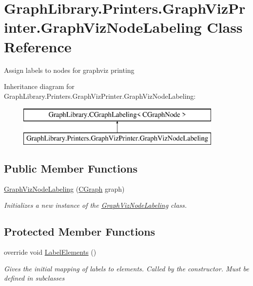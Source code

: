 \hypertarget{class_graph_library_1_1_printers_1_1_graph_viz_printer_1_1_graph_viz_node_labeling}{}\section{Graph\+Library.\+Printers.\+Graph\+Viz\+Printer.\+Graph\+Viz\+Node\+Labeling Class Reference}
\label{class_graph_library_1_1_printers_1_1_graph_viz_printer_1_1_graph_viz_node_labeling}


Assign labels to nodes for graphviz printing  


Inheritance diagram for Graph\+Library.\+Printers.\+Graph\+Viz\+Printer.\+Graph\+Viz\+Node\+Labeling\+:\begin{figure}[H]
\begin{center}
\leavevmode
\includegraphics[height=2.000000cm]{class_graph_library_1_1_printers_1_1_graph_viz_printer_1_1_graph_viz_node_labeling}
\end{center}
\end{figure}
\subsection*{Public Member Functions}
\begin{DoxyCompactItemize}
\item 
\hyperlink{class_graph_library_1_1_printers_1_1_graph_viz_printer_1_1_graph_viz_node_labeling_ac9d3114f90663140e34050c62cd90497}{Graph\+Viz\+Node\+Labeling} (\hyperlink{class_graph_library_1_1_c_graph}{C\+Graph} graph)
\begin{DoxyCompactList}\small\item\em Initializes a new instance of the \hyperlink{class_graph_library_1_1_printers_1_1_graph_viz_printer_1_1_graph_viz_node_labeling}{Graph\+Viz\+Node\+Labeling} class. \end{DoxyCompactList}\end{DoxyCompactItemize}
\subsection*{Protected Member Functions}
\begin{DoxyCompactItemize}
\item 
override void \hyperlink{class_graph_library_1_1_printers_1_1_graph_viz_printer_1_1_graph_viz_node_labeling_a5e6ecfffa91b069313f4e2b319b9a48c}{Label\+Elements} ()
\begin{DoxyCompactList}\small\item\em Gives the initial mapping of labels to elements. Called by the constructor. Must be defined in subclasses \end{DoxyCompactList}\end{DoxyCompactItemize}
